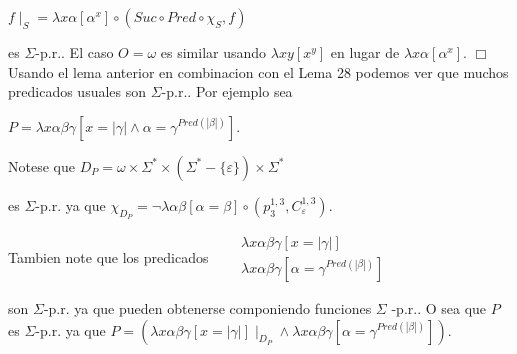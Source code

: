 \(\displaystyle f\mid _{S}=\lambda x\alpha \left[ \alpha ^{x}\right] \circ \left( Suc\circ Pred\circ \chi _{S},f\right) \)

es \(\Sigma \)-p.r.. El caso \(O=\omega \) es similar usando \(\lambda xy\left[ x^{y}\right] \) en lugar de \(\lambda x\alpha \left[ \alpha ^{x}\right] \). \(\Box\)
Usando el lema anterior en combinacion con el Lema 28 podemos ver que muchos predicados usuales son \(\Sigma \)-p.r.. Por ejemplo sea

\(\displaystyle P=\lambda x\alpha \beta \gamma \left[ x=\left\vert \gamma \right\vert \wedge \alpha =\gamma ^{Pred(\left\vert \beta \right\vert )}\right] . \)

Notese que
\(\displaystyle D_{P}=\omega \times \Sigma ^{\ast }\times (\Sigma ^{\ast }-\{\varepsilon \})\times \Sigma ^{\ast } \)

es \(\Sigma \)-p.r. ya que
\(\displaystyle \chi _{D_{P}}=\lnot \lambda \alpha \beta \left[ \alpha =\beta \right] \circ \left( p_{3}^{1,3},C_{\varepsilon }^{1,3}\right) . \)

Tambien note que los predicados
\(\displaystyle \begin{array}{rcl} & & \lambda x\alpha \beta \gamma \left[ x=\left\vert \gamma \right\vert \right] \\ & & \lambda x\alpha \beta \gamma \left[ \alpha =\gamma ^{Pred(\left\vert \beta \right\vert )}\right] \end{array} \)

son \(\Sigma \)-p.r. ya que pueden obtenerse componiendo funciones \(\Sigma \) -p.r.. O sea que \(P\) es \(\Sigma \)-p.r. ya que
\(\displaystyle P=\left( \lambda x\alpha \beta \gamma \left[ x=\left\vert \gamma \right\vert \right] \mid _{D_{P}}\wedge \lambda x\alpha \beta \gamma \left[ \alpha =\gamma ^{Pred(\left\vert \beta \right\vert )}\right] \right) . \)
